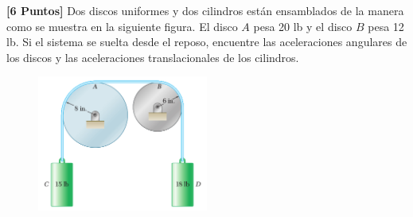 \documentclass[ a4paper, twoside, 11pt]{article}
\begin{document}
\begin{problem}
\textbf{[6 Puntos]} Dos discos uniformes y dos cilindros est\'an ensamblados de la manera como se muestra en la siguiente figura. El disco $A$ pesa 20 lb y el disco $B$ pesa 12 lb. Si el sistema se suelta desde el reposo, encuentre las aceleraciones angulares de los discos y las aceleraciones translacionales de los cilindros. 

\begin{figure}[H]
\centering
\includegraphics[width=0.50\textwidth]{problema-02.jpg}
\end{figure}


\end{problem}
\end{document}
